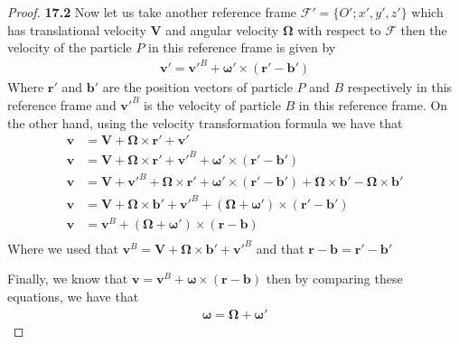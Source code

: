 \documentclass[11pt]{article}
\theoremstyle{definition}
\begin{document}
\begin{proof}{\textbf{17.2}}
    Now let us take another reference frame $\mathcal{F'} = \{O';x',y',z'\}$
    which has translational velocity $\bm{V}$ and angular velocity $\bm{\Omega}$
    with respect to $\mathcal{F}$ then the velocity of the particle $P$
    in this reference frame is given by
    \begin{align*}
        \bm{v}' = \bm{v}'^B + \bm{\omega}'\times (\bm{r}' - \bm{b}')
    \end{align*}
    Where $\bm{r}'$ and $\bm{b}'$ are the position vectors of particle $P$ and
    $B$ respectively in this reference frame and $\bm{v}'^B$ is the velocity
    of particle $B$ in this reference frame.
    On the other hand, using the velocity transformation formula we have that
    \begin{align*}
        \bm{v} &= \bm{V} + \bm{\Omega}\times \bm{r}' + \bm{v}'\\
        \bm{v} &= \bm{V} + \bm{\Omega}\times \bm{r}' + \bm{v}'^B
        + \bm{\omega}'\times (\bm{r}' - \bm{b}')\\
        \bm{v} &= \bm{V} + \bm{v}'^B + \bm{\Omega}\times \bm{r}'
        + \bm{\omega}'\times (\bm{r}' - \bm{b}')
        + \bm{\Omega}\times \bm{b}' - \bm{\Omega}\times \bm{b}'\\
        \bm{v} &= \bm{V} + \bm{\Omega}\times \bm{b}' + \bm{v}'^B
        + (\bm{\Omega} + \bm{\omega}')\times (\bm{r}' - \bm{b}')\\
        \bm{v} &= \bm{v}^B +
        (\bm{\Omega} + \bm{\omega}')\times (\bm{r} - \bm{b})\\
    \end{align*}
    Where we used that $\bm{v}^B = \bm{V} + \bm{\Omega}\times \bm{b}' + \bm{v}'^B$
    and that $\bm{r} - \bm{b} = \bm{r}' - \bm{b}'$

    Finally, we know that
    $\bm{v} = \bm{v}^B + \bm{\omega}\times (\bm{r} - \bm{b})$
    then by comparing these equations, we have that
    \begin{align*}
        \bm{\omega} = \bm{\Omega} + \bm{\omega}'
    \end{align*}
\end{proof}
\cleardoublepage
\end{document}
